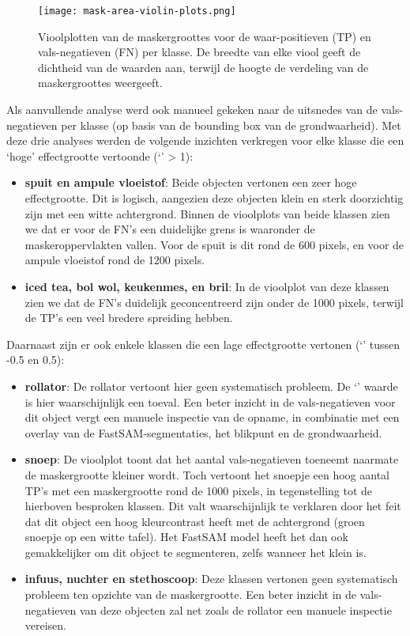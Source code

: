 \begin{figure}[H]
  \centering
  \texttt{[image: mask-area-violin-plots.png]}
  \caption[]{\label{fig:violinplot-fn-tp}
    Vioolplotten van de maskergroottes voor de waar-positieven (TP) en vals-negatieven (FN) per klasse.
    De breedte van elke viool geeft de dichtheid van de waarden aan, terwijl de hoogte de verdeling van de maskergroottes weergeeft.
  }
\end{figure}

Als aanvullende analyse werd ook manueel gekeken naar de uitsnedes van de vals-negatieven per klasse (op basis van de bounding box van de grondwaarheid).
Met deze drie analyses werden de volgende inzichten verkregen voor elke klasse die een `hoge' effectgrootte vertoonde (`' > 1):
\begin{itemize}
    \item \textbf{spuit en ampule vloeistof}: Beide objecten vertonen een zeer hoge effectgrootte.
    Dit is logisch, aangezien deze objecten klein en sterk doorzichtig zijn met een witte achtergrond. 
    Binnen de vioolplots van beide klassen zien we dat er voor de FN's een duidelijke grens is waaronder de maskeroppervlakten vallen. 
    Voor de spuit is dit rond de 600 pixels, en voor de ampule vloeistof rond de 1200 pixels.
    \item \textbf{iced tea, bol wol, keukenmes, en bril}: In de vioolplot van deze klassen zien we dat de FN's duidelijk geconcentreerd zijn onder de 1000 pixels,
    terwijl de TP's een veel bredere spreiding hebben. 
\end{itemize}
Daarnaast zijn er ook enkele klassen die een lage effectgrootte vertonen (`' tussen -0.5 en 0.5):
\begin{itemize}
    \item \textbf{rollator}: De rollator vertoont hier geen systematisch probleem. De `' waarde is hier waarschijnlijk een toeval.
    Een beter inzicht in de vals-negatieven voor dit object vergt een manuele inspectie van de opname, in combinatie met een overlay van de FastSAM-segmentaties, het blikpunt en de grondwaarheid.
    \item \textbf{snoep}: De vioolplot toont dat het aantal vals-negatieven toeneemt naarmate de maskergrootte kleiner wordt. 
    Toch vertoont het snoepje een hoog aantal TP's met een maskergrootte rond de 1000 pixels, in tegenstelling tot de hierboven besproken klassen.
    Dit valt waarschijnlijk te verklaren door het feit dat dit object een hoog kleurcontrast heeft met de achtergrond (groen snoepje op een witte tafel).
    Het FastSAM model heeft het dan ook gemakkelijker om dit object te segmenteren, zelfs wanneer het klein is.
    \item \textbf{infuus, nuchter en stethoscoop}: Deze klassen vertonen geen systematisch probleem ten opzichte van de maskergrootte.
    Een beter inzicht in de vals-negatieven van deze objecten zal net zoals de rollator een manuele inspectie vereisen. 
\end{itemize}
